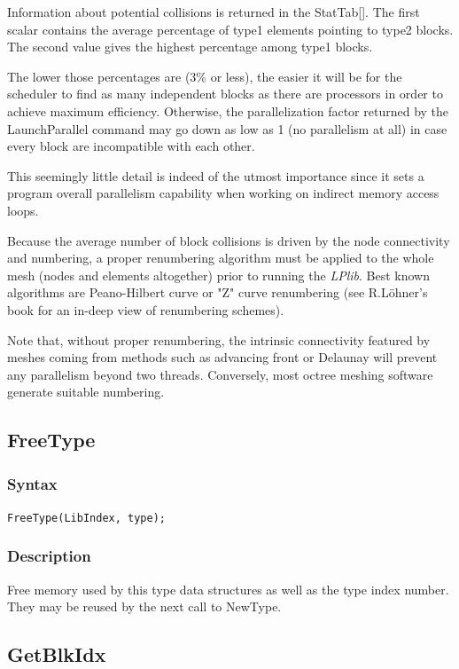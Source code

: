 \documentclass[a4paper,12pt]{article}
\begin{document}
Information about potential collisions is returned in the StatTab[]. The first scalar contains the average percentage of type1 elements pointing to type2 blocks. The second value gives the highest percentage among type1 blocks.

The lower those percentages are (3\% or less), the easier it will be for the scheduler to find as many independent blocks as there are processors in order to achieve maximum efficiency. Otherwise, the parallelization factor returned by the LaunchParallel command may go down as low as 1 (no parallelism at all) in case every block are incompatible with each other.

This seemingly little detail is indeed of the utmost importance since it sets a program overall parallelism capability when working on indirect memory access loops.

Because the average number of block collisions is driven by the node connectivity and numbering, a proper renumbering algorithm must be applied to the whole mesh (nodes and elements altogether) prior to running the \emph{LPlib}. Best known algorithms are Peano-Hilbert curve or "Z" curve renumbering (see R.Löhner's book \cite {lohner} for an in-deep view of renumbering schemes).

Note that, without proper renumbering, the intrinsic connectivity featured by meshes coming from methods such as advancing front or Delaunay will prevent any parallelism beyond two threads. Conversely, most octree meshing software generate suitable numbering.


\subsection{FreeType}

\subsubsection*{Syntax}
\tt{FreeType(LibIndex, type);}
\normalfont

\subsubsection*{Description}
Free memory used by this type data structures as well as the type index number. They may be reused by the next call to NewType.


\subsection{GetBlkIdx}
\end{document}

